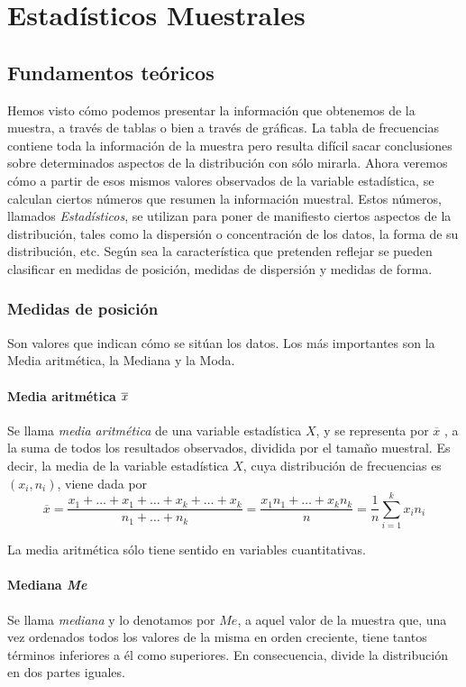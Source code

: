\chapter{Estadísticos Muestrales}

\section{Fundamentos teóricos}
Hemos visto cómo podemos presentar la información que obtenemos de la muestra, a través de tablas o bien a través de
gráficas.
La tabla de frecuencias contiene toda la información de la muestra pero resulta difícil sacar conclusiones sobre
determinados aspectos de la distribución con sólo mirarla.
Ahora veremos cómo a partir de esos mismos valores observados de la variable estadística, se calculan ciertos números
que resumen la información muestral.
Estos números, llamados \emph{Estadísticos}, se utilizan para poner de manifiesto ciertos aspectos de la distribución,
tales como la dispersión o concentración de los datos, la forma de su distribución, etc.
Según sea la característica que pretenden reflejar se pueden clasificar en medidas de posición, medidas de dispersión y medidas de forma.

\subsection{Medidas de posición}
Son valores que indican cómo se sitúan los datos. Los más importantes son la Media aritmética, la Mediana y la Moda.

\subsubsection{Media aritmética $ \overline{\mbox{\textit{x}}}$}
Se llama \emph{media aritmética} de una variable estadística $X$, y se representa por $\overline{x}$ , a la suma de
todos los resultados observados, dividida por el tamaño muestral. 
Es decir, la media de la variable estadística $X$, cuya distribución de frecuencias es $(x_i,n_i)$, viene dada por
\[
\overline{x}=\frac{x_1+\ldots+x_1+\ldots+x_k+\ldots+x_k}{n_1+\ldots+n_k}=\frac{x_1n_1+\ldots+x_kn_k}{n}=\frac{1}{n}\sum_{i=1}^{k}x_in_i
\]

La media aritmética sólo tiene sentido en variables cuantitativas.

\subsubsection{Mediana \textit{Me}}
Se llama \emph{mediana} y lo denotamos por $Me$, a aquel valor de la muestra que, una vez ordenados todos los valores de
la misma en orden creciente, tiene tantos términos inferiores a él como superiores.
En consecuencia, divide la distribución en dos partes iguales.

